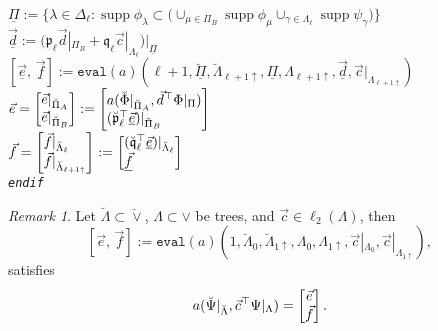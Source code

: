 \documentclass{amsart}
\theoremstyle{definition}
\theoremstyle{remark}
\newtheorem{remark}[theorem]{Remark}
\numberwithin{equation}{section}
\DeclareMathOperator{\supp}{supp}
\newcommand{\1}{\mathbb 1}
\begin{document}
{\begin{tabbing}
\>$\underline{\Pi}:=\{\lambda \in \Delta_{\ell}\colon \supp \phi_\lambda \subset \big(\cup_{\mu \in \Pi_B} \supp \phi_\mu \cup_{\gamma \in \Lambda_\ell} \supp\psi_\gamma\big)\}$\\ 
%
\>$\underline{\vec{d}}:=\big(\mathfrak{p}_{\ell} \vec{d}|_{\Pi_B}+\mathfrak{q}_\ell \vec{c}|_{\Lambda_{\ell}}\big)|_{\underline{\Pi}}$\\
\>$[\underline{\vec{e}},\,\underline{\vec{f}}]:=\mathtt{eval}(a)(\ell+1, \breve{\underline{\Pi}}, \breve{\Lambda}_{\ell+1\uparrow}, \underline{\Pi}, \Lambda_{\ell+1\uparrow},\underline{\vec{d}}, \vec{c}|_{\Lambda_{\ell+1\uparrow}})$\\
\>$\vec{e}=
\left[\begin{array}{@{}l@{}} \vec{e}|_{\breve{\Pi}_A}\\ \vec{e}|_{\breve{\Pi}_B}\end{array}\right]
:=
\left[\begin{array}{@{}l@{}} a(\breve{\Phi}|_{\breve{\Pi}_A},\vec{d}^\top\Phi|_{\Pi}) \\ 
(\breve{\mathfrak{p}}_{\ell} ^\top \underline{\vec{e}})|_{\breve{\Pi}_B}
\end{array}\right]$\\
\>$\vec{f}=
\left[\begin{array}{@{}l@{}} \vec{f}|_{\breve{\Lambda}_\ell} \\ \vec{f}|_{\breve{\Lambda}_{\ell+1\uparrow}}\end{array}\right]
:=
\left[\begin{array}{@{}l@{}} (\mathfrak{\breve{q}}_\ell^\top \underline{\vec{e}})|_{\breve{\Lambda}_{\ell}} \\ \underline{\vec{f}} \end{array}\right]$\\
{\em \texttt{endif}}
 \end{tabbing}}
 
   \begin{remark}  Let $\breve{\Lambda} \subset \breve{\vee}$, $\Lambda \subset \vee$ be  trees, and $\vec{c} \in \ell_2(\Lambda)$, then
 $$
  [\vec{e},\,\vec{f}]:=\mathtt{eval}(a)(1,\breve{\Lambda}_{0},\breve{\Lambda}_{1 \uparrow},\Lambda_{0},\Lambda_{1 \uparrow},\vec{c}|_{\Lambda_0},\vec{c}|_{\Lambda_{1 \uparrow}}),
 $$
satisfies
$$
a(\breve{\Psi}|_{\breve{\Lambda}},\vec{c}^\top \Psi|_{\Lambda})
=
\left[\begin{array}{@{}c@{}} \vec{e} \\ \vec{f}
 \end{array}\right].
$$
\end{remark}
\end{document}
